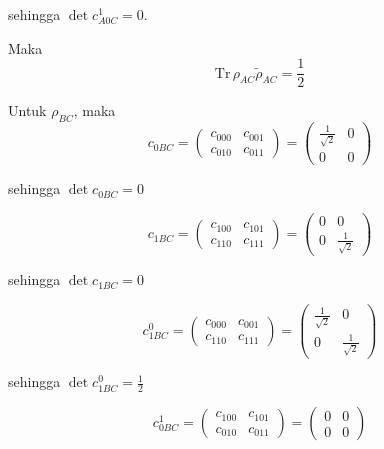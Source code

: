 \begin{enumerate}
	sehingga $\det c_{A0C}^1 = 0$.
	
	Maka
	\begin{equation}
		\mathrm{Tr}\,\rho_{AC}\tilde{\rho}_{AC}=\frac{1}{2}
	\end{equation}
	
	Untuk $\rho_{BC}$, maka
	\begin{equation}
		c_{0BC}=
		\begin{pmatrix}
			c_{000} & c_{001} \\
			c_{010} & c_{011}
		\end{pmatrix}=
		\begin{pmatrix}
			\frac{1}{\sqrt{2}} & 0 \\
			0 & 0
		\end{pmatrix}
	\end{equation}
	
	sehingga $\det c_{0BC} = 0$
	
	\begin{equation}
		c_{1BC}=
		\begin{pmatrix}
			c_{100} & c_{101} \\
			c_{110} & c_{111}
		\end{pmatrix}=
		\begin{pmatrix}
			0 & 0 \\
			0 & \frac{1}{\sqrt{2}}
		\end{pmatrix}
	\end{equation}
	
	sehingga $\det c_{1BC} = 0$
	
	\begin{equation}
		c_{1BC}^0=
		\begin{pmatrix}
			c_{000} & c_{001} \\
			c_{110} & c_{111}
		\end{pmatrix}=
		\begin{pmatrix}
			\frac{1}{\sqrt{2}} & 0 \\
			0 & \frac{1}{\sqrt{2}}
		\end{pmatrix}
	\end{equation}
	
	sehingga $\det c_{1BC}^0 = \frac{1}{2}$
	
	\begin{equation}
		c_{0BC}^1=
		\begin{pmatrix}
			c_{100} & c_{101} \\
			c_{010} & c_{011}
		\end{pmatrix}=
		\begin{pmatrix}
			0 & 0 \\
			0 & 0
		\end{pmatrix}
	\end{equation}
	

\end{enumerate}
